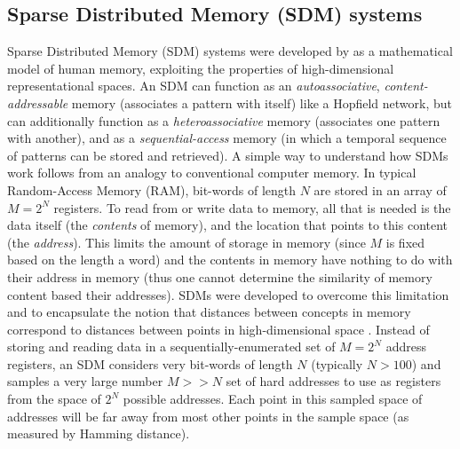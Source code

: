\documentclass[10pt,letterpaper]{article}
\begin{document}
\subsection{Sparse Distributed Memory (SDM) systems}

Sparse Distributed Memory (SDM) systems were developed by  as a mathematical model of human memory, exploiting the properties of high-dimensional representational spaces.
An SDM can function as an \textit{autoassociative}, \textit{content-addressable} memory (associates a pattern with itself) like a Hopfield network, but can additionally function as a \textit{heteroassociative} memory (associates one pattern with another), and as a \textit{sequential-access} memory (in which a temporal sequence of patterns can be stored and retrieved). A simple way to understand how SDMs work follows from an analogy to conventional computer memory. In typical Random-Access Memory (RAM), bit-words of length $N$ are stored in an array of $M = 2^{N}$ registers. To read from or write data to memory, all that is needed is the data itself (the \textit{contents} of memory), and the location that points to this content (the \textit{address}). This limits the amount of storage in memory (since $M$ is fixed based on the length a word) and the contents in memory have nothing to do with their address in memory (thus one cannot determine the similarity of memory content based their addresses). SDMs were developed to overcome this limitation and to encapsulate the notion that distances between concepts in memory correspond to distances between points in high-dimensional space \cite{Kanerva1988}. Instead of storing and reading data in a sequentially-enumerated set of $M = 2^{N}$ address registers, an SDM considers very bit-words of length $N$ (typically $N > 100$) and samples a very large number $M >> N$ set of hard addresses to use as registers from the space of $2^{N}$ possible addresses. Each point in this sampled space of addresses will be far away from most other points in the sample space (as measured by Hamming distance).
\end{document}
